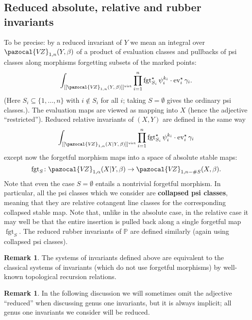 \documentclass[11pt]{amsart}
\newcommand{\VZ}{\pazocal{V\!Z}}
\renewcommand{\to}{\rightarrow}
\newcommand{\virt}[1]{[#1]^{\operatorname{virt}}}
\newcommand{\ev}{\operatorname{ev}}
\newcommand{\fgt}{\operatorname{fgt}}
\theoremstyle{definition}
\theoremstyle{definition}
\newtheorem{remark}[thm]{Remark}
\begin{document}
\subsection{Reduced absolute, relative and rubber invariants} To be precise: by a reduced invariant of $Y$ we mean an integral over $\VZ_{1,n}(Y,\beta)$ of a product of evaluation classes and pullbacks of psi classes along morphisms forgetting subsets of the marked points:
\begin{equation*} \int_{\virt{[\VZ_{1,n}(Y,\, \beta)]}} \prod_{i=1}^n \fgt_{S_i}^\star \psi_i^{k_i} \cdot \ev_i^\star \gamma_i.\end{equation*}
(Here $S_i \subseteq \{1,\ldots,n\}$ with $i \not\in S_i$ for all $i$; taking $S=\emptyset$ gives the ordinary  psi classes.). The evaluation maps are viewed as mapping into $X$ (hence the adjective ``restricted''). Reduced relative invariants of $(X,Y)$ are defined in the same way
\begin{equation*} \int_{\virt{[\VZ_{1,\alpha}(X|Y,\, \beta)]}} \prod_{i=1}^n \fgt_{S_i}^\star \psi_i^{k_i} \cdot \ev_i^\star \gamma_i\end{equation*}
except now the forgetful morphism maps into a space of absolute stable maps:
\begin{equation*} \fgt_S \colon \VZ_{1,\alpha}(X|Y,\beta) \to \VZ_{1,n-\#S}(X,\beta).\end{equation*}
Note that even the case $S=\emptyset$ entails a nontrivial forgetful morphism. In particular, all the psi classes which we consider are \textbf{collapsed psi classes}, meaning that they are relative cotangent line classes for the corresponding collapsed stable map. Note that, unlike in the absolute case, in the relative case it may well be that the entire insertion is pulled back along a single forgetful map $\fgt_S$. The reduced rubber invariants of $\mathbb{P}$ are defined similarly (again using collapsed psi classes).

\begin{remark}The systems of invariants defined above are equivalent to the classical systems of invariants (which do not use forgetful morphisms) by well-known topological recursion relations.\end{remark}

\begin{remark} In the following discussion we will sometimes omit the adjective ``reduced'' when discussing genus one invariants, but it is always implicit; all genus one invariants we consider will be reduced.\end{remark}
\end{document}
